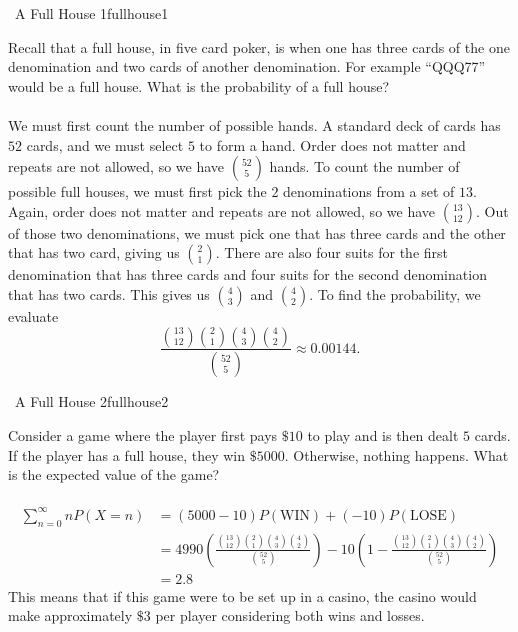         \pagebreak
        \begin{example}{\Difficulty\,\Difficulty\,\,A Full House 1}{fullhouse1}
        
            Recall that a full house, in five card poker, is when one has three cards of the one denomination and two cards of another denomination. For example ``QQQ77'' would be a full house. What is the probability of a full house?
            \\
            \\
            We must first count the number of possible hands. A standard deck of cards has \(52\) cards, and we must select \(5\) to form a hand. Order does not matter and repeats are not allowed, so we have \(\binom{52}{5}\) hands. To count the number of possible full houses, we must first pick the \(2\) denominations from a set of \(13\). Again, order does not matter and repeats are not allowed, so we have \(\binom{13}{12}\). Out of those two denominations, we must pick one that has three cards and the other that has two card, giving us \(\binom{2}{1}\). There are also four suits for the first denomination that has three cards and four suits for the second denomination that has two cards. This gives us \(\binom{4}{3}\) and \(\binom{4}{2}\). To find the probability, we evaluate
            \begin{equation*}
                \frac{\binom{13}{12}\binom{2}{1}\binom{4}{3}\binom{4}{2}}{\binom{52}{5}}\approx0.00144.
            \end{equation*}
        
        \end{example}
        \begin{example}{\Difficulty\,\Difficulty\,\,A Full House 2}{fullhouse2}
        
            Consider a game where the player first pays \(\$10\) to play and is then dealt \(5\) cards. If the player has a full house, they win \(\$5000\). Otherwise, nothing happens. What is the expected value of the game?
            \\
            \\
            \begin{align*}
                \sum_{n=0}^\infty nP(X=n)&=(5000-10)P(\text{WIN})+(-10)P(\text{LOSE}) \\
                &=4990\left(\frac{\binom{13}{12}\binom{2}{1}\binom{4}{3}\binom{4}{2}}{\binom{52}{5}}\right)-10\left(1-\frac{\binom{13}{12}\binom{2}{1}\binom{4}{3}\binom{4}{2}}{\binom{52}{5}}\right) \\
                &=2.8
            \end{align*}
            This means that if this game were to be set up in a casino, the casino would make approximately \(\$3\) per player considering both wins and losses.
        
        \end{example}
